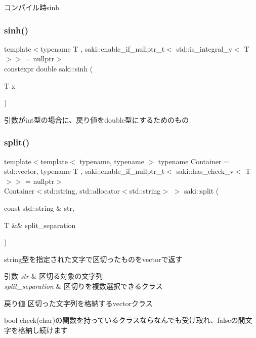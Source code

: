 コンパイル時sinh 

\mbox{\label{namespacesaki_a8199390b7650fdebe491aaeb4c3a44c3}} 
\subsubsection{\texorpdfstring{sinh()}{sinh()}\hspace{0.1cm}{\footnotesize\ttfamily [2/2]}}
{\footnotesize\ttfamily template$<$typename T , saki\+::enable\+\_\+if\+\_\+nullptr\+\_\+t$<$ std\+::is\+\_\+integral\+\_\+v$<$ T $>$$>$  = nullptr$>$ \\
constexpr double saki\+::sinh (\begin{DoxyParamCaption}\item[{T}]{x }\end{DoxyParamCaption})}



引数がint型の場合に、戻り値をdouble型にするためのもの 

\mbox{\label{namespacesaki_ad15185db28f6e77d65411ca83f64f5bb}} 
\subsubsection{\texorpdfstring{split()}{split()}\hspace{0.1cm}{\footnotesize\ttfamily [1/2]}}
{\footnotesize\ttfamily template$<$template$<$ typename, typename $>$ typename Container = std\+::vector, typename T , saki\+::enable\+\_\+if\+\_\+nullptr\+\_\+t$<$ saki\+::has\+\_\+check\+\_\+v$<$ T $>$$>$  = nullptr$>$ \\
Container$<$std\+::string, std\+::allocator$<$std\+::string$>$ $>$ saki\+::split (\begin{DoxyParamCaption}\item[{const std\+::string \&}]{str,  }\item[{T \&\&}]{split\+\_\+separation }\end{DoxyParamCaption})}



string型を指定された文字で区切ったものをvectorで返す 


\begin{DoxyParams}{引数}
{\em str} & 区切る対象の文字列 \\
\hline
{\em split\+\_\+separation} & 区切りを複数選択できるクラス \\
\hline
\end{DoxyParams}
\begin{DoxyReturn}{戻り値}
区切った文字列を格納するvectorクラス
\end{DoxyReturn}
bool check(char)の関数を持っているクラスならなんでも受け取れ、falseの間文字を格納し続けます \mbox{\label{namespacesaki_a937a85e91730e4bb6fb84a9f1027d205}} 
